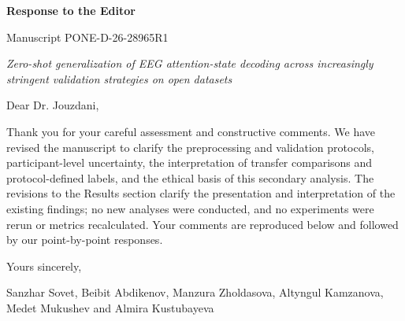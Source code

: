 \documentclass{article}
\begin{document}
%
%


\begin{center}
{\Large\bfseries Response to the Editor}

\vspace{0.2cm}
Manuscript PONE-D-26-28965R1

\vspace{0.1cm}
\textit{Zero-shot generalization of EEG attention-state decoding across
increasingly stringent validation strategies on open datasets}
\end{center}

\vspace{0.3cm}

\noindent
Dear Dr. Jouzdani,

\vspace{0.2cm}
\noindent
Thank you for your careful assessment and constructive comments. We have revised
the manuscript to clarify the preprocessing and validation protocols,
participant-level uncertainty, the interpretation of transfer comparisons and
protocol-defined labels, and the ethical basis of this secondary analysis. The
revisions to the Results section clarify the presentation and interpretation of
the existing findings; no new analyses were conducted, and no experiments were
rerun or metrics recalculated. Your comments are reproduced below and followed
by our point-by-point responses.

\vspace{0.4cm}
\noindent
Yours sincerely,

\vspace{0.2cm}
\noindent
Sanzhar Sovet, Beibit Abdikenov, Manzura Zholdasova, Altyngul Kamzanova,
Medet Mukushev and Almira Kustubayeva


\newpage
\setcounter{tcb@cnt@cmt}{0}
\end{document}
